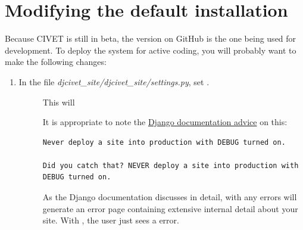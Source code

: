\documentclass[letterpaper,10pt,english]{sphinxmanual}
\begin{document}
\section{Modifying the default installation}
\label{installing:modifying-the-default-installation}
Because CIVET is still in beta, the version on GitHub is the one being used for
development. To deploy the system for active coding, you will probably want
to make the following changes:
\begin{enumerate}
\item {} \begin{description}
\item[{In the file \emph{djcivet\_site/djcivet\_site/settings.py}, set .}] \leavevmode
This will

It is appropriate to note the \href{https://docs.djangoproject.com/en/1.8/ref/settings/}{Django documentation advice}
on this:

\begin{Verbatim}[commandchars=\\\{\}]
Never deploy a site into production with DEBUG turned on.

Did you catch that? NEVER deploy a site into production with DEBUG turned on.
\end{Verbatim}

As the Django documentation discusses in detail, with  any
errors will generate an error page containing extensive internal detail
about your site. With , the user just sees a 
error.

\end{description}

\end{enumerate}
\end{document}
